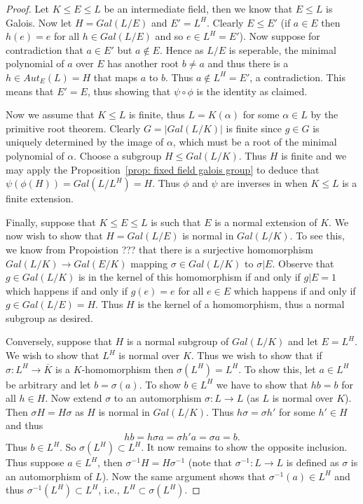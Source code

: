 \documentclass[twoside, a4paper, 10pt]{amsart}
\begin{document}
\begin{proof} Let $K \leq E \leq L$ be an intermediate field, then we know that $E \leq L$ is Galois. Now let $H = Gal(L/E)$ and $E' = L^H$. Clearly $E \leq E'$ (if $a \in E$ then $h(e) = e$ for all $h \in Gal(L/E)$ and so $e \in L^H = E'$). Now suppose for contradiction that $a \in E'$ but $a \notin E$. Hence as $L/E$ is seperable, the minimal polynomial of $a$ over $E$ has another root $b \neq a$ and thus there is a $h \in Aut_E(L) = H$ that maps $a$ to $b$. Thus $a \notin L^H = E'$, a contradiction. This means that $E' = E$, thus showing that $\psi \circ \phi$ is the identity as claimed.

Now we assume that $K \leq L$ is finite, thus $L = K(\alpha)$ for some $\alpha \in L$ by the primitive root theorem. Clearly $G = |Gal(L/K)|$ is finite since $g \in G$ is uniquely determined by the image of $\alpha$, which must be a root of the minimal polynomial of $\alpha$. Choose a subgroup $H \leq Gal(L/K)$. Thus $H$ is finite and we may apply the Proposition~\ref{prop: fixed field galois group} to deduce that $\psi(\phi(H)) = Gal(L/L^H) = H$. Thus $\phi$ and $\psi$ are inverses in when $K \leq L$ is a finite extension.

Finally, suppose that $K \leq E \leq L$ is such that $E$ is a normal extension of $K$. We now wish to show that $H = Gal(L/E)$ is normal in $Gal(L/K)$. To see this, we know from Propoistion ??? that there is a surjective homomorphism $Gal(L/K) \to Gal(E/K)$ mapping $\sigma \in Gal(L/K)$ to $\sigma|E$. Observe that $g \in Gal(L/K)$ is in the kernel of this homomorphism if and only if $g|E = 1$ which happens if and only if $g(e) = e$ for all $e \in E$ which happens if and only if $g \in Gal(L/E) = H$. Thus $H$ is the kernel of a homomorphism, thus a normal subgroup as desired.

Conversely, suppose that $H$ is a normal subgroup of $Gal(L/K)$ and let $E = L^H$. We wish to show that $L^H$ is normal over $K$. Thus we wish to show that if $\sigma:L^H \to \overline{K}$ is a $K$-homomorphism then $\sigma(L^H) = L^H$. To show this, let $a \in L^H$ be arbitrary and let $b = \sigma(a)$. To show $b \in L^H$ we have to show that $hb = b$ for all $h \in H$. Now extend $\sigma$ to an automorphism $\sigma:L \to L$ (as $L$ is normal over $K$). Then $\sigma H = H \sigma$ as $H$ is normal in $Gal(L/K)$. Thus $h \sigma = \sigma h'$ for some $h' \in H$ and thus $$ h b = h \sigma a = \sigma h'a = \sigma a = b.$$ Thus $b \in L^H$. So $\sigma(L^H) \subset L^H$. It now remains to show the opposite inclusion. Thus suppose $a \in L^H$, then $\sigma^{-1}H = H \sigma^{-1}$  (note that $\sigma^{-1}:L \to L$ is defined as $\sigma$ is an automorphism of $L$). Now the same argument shows that $\sigma^{-1}(a) \in L^H$ and thus $\sigma^{-1}(L^H) \subset L^H$, i.e., $L^H \subset \sigma(L^H)$. \end{proof}
\end{document}
